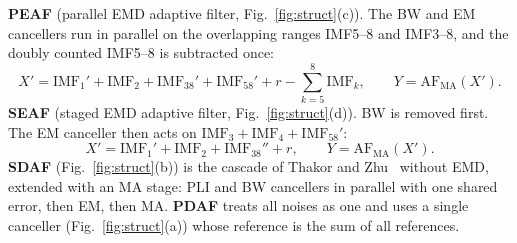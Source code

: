 \documentclass[11pt,a4paper]{article}
\newcommand{\imf}[1]{\mathrm{IMF}_{#1}}
\begin{document}
\textbf{PEAF} (parallel EMD adaptive filter, Fig.~\ref{fig:struct}(c)). The BW and EM cancellers run in parallel on
the overlapping ranges IMF5--8 and IMF3--8, and the doubly counted IMF5--8 is subtracted once:
\begin{equation}
  X' = \imf{1}' + \imf{2} + \imf{38}' + \imf{58}' + r - \textstyle\sum_{k=5}^{8}\imf{k}, \qquad Y=\mathrm{AF}_{\mathrm{MA}}(X').
  \label{eq:peaf}
\end{equation}
\textbf{SEAF} (staged EMD adaptive filter, Fig.~\ref{fig:struct}(d)). BW is removed first. The EM canceller then acts
on $\imf{3}+\imf{4}+\imf{58}'$:
\begin{equation}
  X' = \imf{1}' + \imf{2} + \imf{38}'' + r, \qquad Y=\mathrm{AF}_{\mathrm{MA}}(X').
  \label{eq:seaf}
\end{equation}
\textbf{SDAF} (Fig.~\ref{fig:struct}(b)) is the cascade of Thakor and Zhu~\cite{thakor} without EMD, extended with an MA
stage: PLI and BW cancellers in parallel with one shared error, then EM, then MA. \textbf{PDAF} treats all noises as
one and uses a single canceller (Fig.~\ref{fig:struct}(a)) whose reference is the sum of all references.
\end{document}
